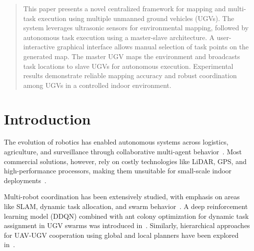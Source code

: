 \documentclass[conference]{IEEEtran}
\begin{document}
\author{
}

\maketitle

\begin{abstract}
  This paper presents a novel centralized framework for mapping and multi-task execution using multiple unmanned ground vehicles (UGVs). The system leverages ultrasonic sensors for environmental mapping, followed by autonomous task execution using a master-slave architecture. A user-interactive graphical interface allows manual selection of task points on the generated map. The master UGV maps the environment and broadcasts task locations to slave UGVs for autonomous execution. Experimental results demonstrate reliable mapping accuracy and robust coordination among UGVs in a controlled indoor environment.
\end{abstract}

\section{Introduction}
\label{sec:intro}
The evolution of robotics has enabled autonomous systems across logistics, agriculture, and surveillance through collaborative multi-agent behavior~\cite{brambilla2013swarm}. Most commercial solutions, however, rely on costly technologies like LiDAR, GPS, and high-performance processors, making them unsuitable for small-scale indoor deployments~\cite{kalra2005hoplite}.

Multi-robot coordination has been extensively studied, with emphasis on areas like SLAM, dynamic task allocation, and swarm behavior~\cite{brambilla2013swarm, kalra2005hoplite}.  A deep reinforcement learning model (DDQN) combined with ant colony optimization for dynamic task assignment in UGV swarms was introduced in~\cite{jin2024multi}. Similarly, hierarchical approaches for UAV-UGV cooperation using global and local planners have been explored in~\cite{mdpi2022hierarchical}.
\end{document}

